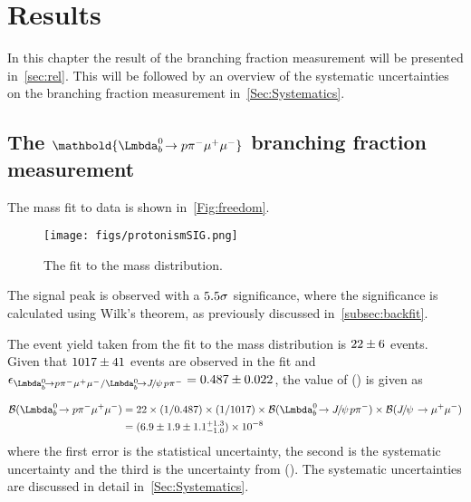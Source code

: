 \chapter{Results}
\label{Sec:Results}

In this chapter the result of the \Lbpi branching fraction measurement will be presented in~\autoref{sec:rel}. This will be followed by an overview of the systematic uncertainties on the \Lbpi branching fraction measurement in~\autoref{Sec:Systematics}. %

\section[The $\Lbpi$ branching fraction measurement]{The $\mathbold{\Lbpi}$ branching fraction measurement}
\label{sec:rel}

The mass fit to \Lbpi data is shown in~\autoref{Fig:freedom}.
\begin{figure}[h!]
  \def\nh{0.7\textwidth}
  \centering
  \hspace*{-1.0cm}
  \texttt{[image: figs/protonismSIG.png]}%
  \caption{The fit to the \Lbpi mass distribution.}%
  \label{Fig:freedom}
\end{figure}

The \Lbpi signal peak is observed with a $5.5\sigma$ significance, where the significance  is calculated using Wilk's theorem, as previously discussed in~\autoref{subsec:backfit}.

The \Lbpi event yield taken from the fit to the \Lbpi mass distribution is $22\pm6$ events. Given that $1017\pm41$ events are observed in the \Lbpijpsi fit and $\epsilon_{\Lbpi/\Lbpijpsi} = \tw$, the value of \BF(\Lbpi) is given as

\begin{equation}
  \begin{split}
    \BF(\Lbpi) & = 22 \times (1/0.487) \times (1/1017) \times \BF(\Lbpijpsi)\times\BF(\jpsi\to\mumu) \\
    & = \BFV\\
  \end{split}\end{equation}
where the first error is the statistical uncertainty, the second is the systematic uncertainty and the third is the uncertainty from \BF(\Lbpijpsi). The systematic uncertainties are discussed in detail in~\autoref{Sec:Systematics}.


